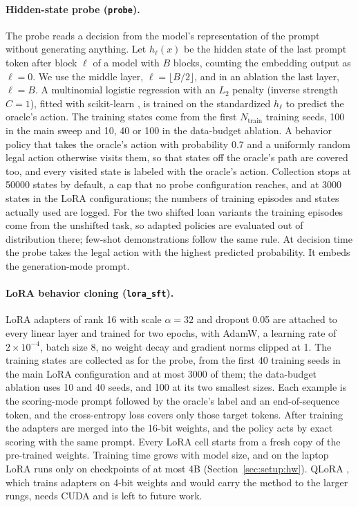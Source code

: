 \paragraph{Hidden-state probe (\texttt{probe}).}
The probe reads a decision from the model's representation of the prompt without generating anything. Let $h_\ell(x)$ be the hidden state of the last prompt token after block $\ell$ of a model with $B$ blocks, counting the embedding output as $\ell=0$. We use the middle layer, $\ell=\lfloor B/2\rfloor$, and in an ablation the last layer, $\ell=B$. A multinomial logistic regression with an $L_2$ penalty (inverse strength $C=1$), fitted with scikit-learn \citep{pedregosa2011scikit}, is trained on the standardized $h_\ell$ to predict the oracle's action. The training states come from the first $N_{\text{train}}$ training seeds, 100 in the main sweep and 10, 40 or 100 in the data-budget ablation. A behavior policy that takes the oracle's action with probability 0.7 and a uniformly random legal action otherwise visits them, so that states off the oracle's path are covered too, and every visited state is labeled with the oracle's action. Collection stops at 50000 states by default, a cap that no probe configuration reaches, and at 3000 states in the LoRA configurations; the numbers of training episodes and states actually used are logged. For the two shifted loan variants the training episodes come from the unshifted task, so adapted policies are evaluated out of distribution there; few-shot demonstrations follow the same rule. At decision time the probe takes the legal action with the highest predicted probability. It embeds the generation-mode prompt.

\paragraph{LoRA behavior cloning (\texttt{lora\_sft}).}
LoRA adapters \citep{hu2022lora} of rank 16 with scale $\alpha=32$ and dropout 0.05 are attached to every linear layer and trained for two epochs, with AdamW, a learning rate of $2\times10^{-4}$, batch size 8, no weight decay and gradient norms clipped at 1. The training states are collected as for the probe, from the first 40 training seeds in the main LoRA configuration and at most 3000 of them; the data-budget ablation uses 10 and 40 seeds, and 100 at its two smallest sizes. Each example is the scoring-mode prompt followed by the oracle's label and an end-of-sequence token, and the cross-entropy loss covers only those target tokens. After training the adapters are merged into the 16-bit weights, and the policy acts by exact scoring with the same prompt. Every LoRA cell starts from a fresh copy of the pre-trained weights. Training time grows with model size, and on the laptop LoRA runs only on checkpoints of at most 4B (Section~\ref{sec:setup:hw}). QLoRA \citep{dettmers2023qlora}, which trains adapters on 4-bit weights and would carry the method to the larger rungs, needs CUDA and is left to future work.


